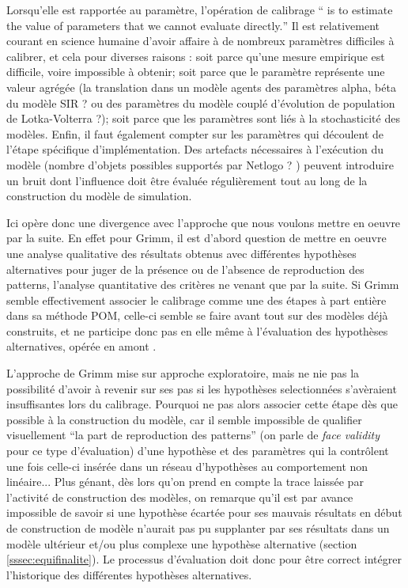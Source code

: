 Lorsqu'elle est rapportée au paramètre, l'opération de calibrage \foreignquote{english}{ is to estimate the value of parameters that we cannot evaluate directly.} Il est relativement courant en science humaine d'avoir affaire à de nombreux paramètres difficiles à calibrer, et cela pour diverses raisons : soit parce qu'une mesure empirique est difficile, voire impossible à obtenir; soit parce que le paramètre représente une valeur agrégée (la translation dans un modèle agents des paramètres alpha, béta du modèle SIR ? ou des paramètres du modèle couplé d'évolution de population de Lotka-Volterra ?); soit parce que les paramètres sont liés à la stochasticité des modèles. Enfin, il faut également compter sur les paramètres qui découlent de l'étape spécifique d'implémentation. Des artefacts nécessaires à l'exécution du modèle (nombre d'objets possibles supportés par Netlogo ? ) peuvent introduire un bruit dont l'influence doit être évaluée régulièrement tout au long de la construction du modèle de simulation.

Ici opère donc une divergence avec l'approche que nous voulons mettre en oeuvre par la suite. En effet pour Grimm, il est d'abord question de mettre en oeuvre une analyse qualitative des résultats obtenus avec différentes hypothèses alternatives pour juger de la présence ou de l'absence de reproduction des patterns, l'analyse quantitative des critères ne venant que par la suite. Si Grimm semble effectivement associer le calibrage comme une des étapes à part entière dans sa méthode POM, celle-ci semble se faire avant tout sur des modèles déjà construits, et ne participe donc pas en elle même à l'évaluation des hypothèses alternatives, opérée en amont . 

L'approche de Grimm mise sur approche exploratoire, mais ne nie pas la possibilité d'avoir à revenir sur ses pas si les hypothèses selectionnées s'avèraient insuffisantes lors du calibrage. Pourquoi ne pas alors associer cette étape dès que possible à la construction du modèle, car il semble impossible de qualifier visuellement \enquote{la part de reproduction des patterns} (on parle de \textit{face validity} pour ce type d'évaluation) d'une hypothèse et des paramètres qui la contrôlent une fois celle-ci insérée dans un réseau d'hypothèses au comportement non linéaire...  Plus génant, dès lors qu'on prend en compte la trace laissée par l'activité de construction des modèles, on remarque qu'il est par avance impossible de savoir si une hypothèse écartée pour ses mauvais résultats en début de construction de modèle n'aurait pas pu supplanter par ses résultats dans un modèle ultérieur et/ou plus complexe une hypothèse alternative (section \ref{sssec:equifinalite}). Le processus d'évaluation doit donc pour être correct intégrer l'historique des différentes hypothèses alternatives.

